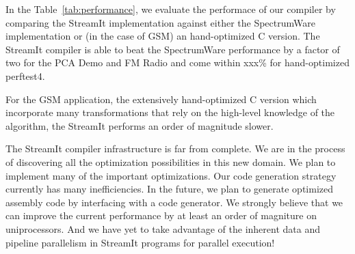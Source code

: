







In the Table~\ref{tab:performance}, we evaluate the performace of our
compiler by comparing the StreamIt implementation against either the
SpectrumWare implementation or (in the case of GSM) an hand-optimized
C version.
The StreamIt compiler is able to beat the SpectrumWare performance by
a factor of two for the PCA Demo and FM Radio and come within xxx\%
for hand-optimized perftest4.

For the GSM application, the extensively hand-optimized C version 
which incorporate many transformations that rely on the high-level
knowledge of the algorithm, the StreamIt performs an order of
magnitude slower.  

The StreamIt compiler infrastructure is far from complete. We are in
the process of discovering all the optimization possibilities in this
new domain.  We plan to implement many of the important optimizations.
Our code generation strategy currently has many inefficiencies. In the
future, we plan to generate optimized assembly code by interfacing
with a code generator.  We strongly believe that we can improve the
current performance by at least an order of magniture on
uniprocessors. And we have yet to take advantage of the inherent data
and pipeline parallelism in StreamIt programs for parallel execution!



